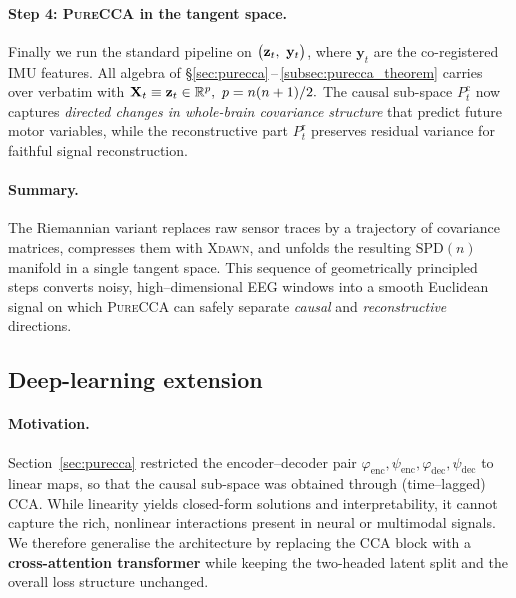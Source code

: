 \documentclass[14pt]{extarticle}
\begin{document}
	\paragraph{Step 4: \textsc{PureCCA} in the tangent space.}
	Finally we run the standard pipeline on
	$\bigl(\mathbf{z}_t,\ \mathbf y_t\bigr)$, where $\mathbf y_t$ are the
	co-registered IMU features.  All algebra of
	\S\ref{sec:purecca}\,–\,\ref{subsec:purecca_theorem} carries over
	verbatim with
	\(
	\mathbf{X}_t\equiv\mathbf{z}_t\in\mathbb{R}^{p},\ p=n(n+1)/2.
	\)
	The causal sub-space $P_t^{\mathrm c}$ now captures \emph{directed
		changes in whole-brain covariance structure} that predict future motor
	variables, while the reconstructive part $P_t^{\mathrm r}$ preserves
	residual variance for faithful signal reconstruction.
	
	\paragraph{Summary.}
	The Riemannian variant replaces raw sensor traces by a trajectory of covariance
	matrices, compresses them with \textsc{Xdawn}, and unfolds the resulting
	$\mathrm{SPD}(n)$ manifold in a single tangent space.
	This sequence of geometrically principled steps converts noisy,
	high–dimensional EEG windows into a smooth Euclidean signal on which
	\textsc{PureCCA} can safely separate \emph{causal} and
	\emph{reconstructive} directions.
	
	\subsection{Deep-learning extension}
	\label{sec:deepcca}
	
	\paragraph{Motivation.}
	Section~\ref{sec:purecca} restricted the encoder--decoder pair
	\(\varphi_{\text{enc}},\psi_{\text{enc}},\varphi_{\text{dec}},\psi_{\text{dec}}\)
	to linear maps, so that the causal sub-space was obtained through
	(time–lagged) CCA.
	While linearity yields closed-form solutions and interpretability, it
	cannot capture the rich, nonlinear interactions present in neural or
	multimodal signals.
	We therefore generalise the architecture by replacing the CCA block with
	a \textbf{cross-attention transformer} while keeping the two-headed
	latent split and the overall loss structure unchanged.
	
\end{document}
